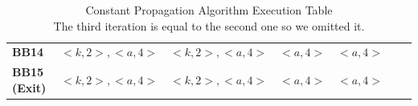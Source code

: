 \begin{table}[H]
{\begin{tabular}{lcccccc}
\textbf{BB14} & $<k, 2>, <a, 4>$ & $<k, 2>, <a, 4>$ & $<a, 4>$ & $<a, 4>$ \\
\textbf{BB15 (Exit)} & $<k, 2>, <a, 4>$ & $<k, 2>, <a, 4>$ & $<a, 4>$ & $<a, 4>$ \\
\bottomrule
\end{tabular}
}
\captionsetup{justification=centering} %
\caption{Constant Propagation Algorithm Execution Table\\[1.5ex] 
The third iteration is equal to the second one so we omitted it.}
\end{table}
